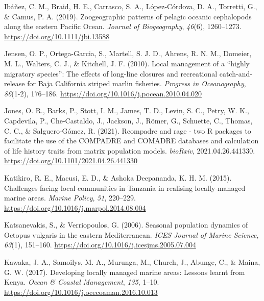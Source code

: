 \documentclass[
]{article}
\newlength{\cslhangindent}
\newlength{\cslentryspacingunit} %
\newenvironment{CSLReferences}[2] %
 {%
  \setlength{\parindent}{0pt}
  \ifodd #1
  \let\oldpar\par
  \def\par{\hangindent=\cslhangindent\oldpar}
  \fi
  \setlength{\parskip}{#2\cslentryspacingunit}
 }%
 {}
\begin{document}
\begin{CSLReferences}{1}{2}
\leavevmode{}%
Ibáñez, C. M., Braid, H. E., Carrasco, S. A., López‐Córdova, D. A., Torretti, G., \& Camus, P. A. (2019). Zoogeographic patterns of pelagic oceanic cephalopods along the eastern {Pacific} {Ocean}. \emph{Journal of Biogeography}, \emph{46}(6), 1260--1273. \url{https://doi.org/10.1111/jbi.13588}

\leavevmode{}%
Jensen, O. P., Ortega-Garcia, S., Martell, S. J. D., Ahrens, R. N. M., Domeier, M. L., Walters, C. J., \& Kitchell, J. F. (2010). Local management of a {``highly migratory species''}: {The} effects of long-line closures and recreational catch-and-release for {Baja} {California} striped marlin fisheries. \emph{Progress in Oceanography}, \emph{86}(1-2), 176--186. \url{https://doi.org/10.1016/j.pocean.2010.04.020}

\leavevmode{}%
Jones, O. R., Barks, P., Stott, I. M., James, T. D., Levin, S. C., Petry, W. K., Capdevila, P., Che-Castaldo, J., Jackson, J., Römer, G., Schuette, C., Thomas, C. C., \& Salguero-Gómez, R. (2021). Rcompadre and rage - two {R} packages to facilitate the use of the {COMPADRE} and {COMADRE} databases and calculation of life history traits from matrix population models. \emph{bioRxiv}, 2021.04.26.441330. \url{https://doi.org/10.1101/2021.04.26.441330}

\leavevmode{}%
Katikiro, R. E., Macusi, E. D., \& Ashoka Deepananda, K. H. M. (2015). Challenges facing local communities in {Tanzania} in realising locally-managed marine areas. \emph{Marine Policy}, \emph{51}, 220--229. \url{https://doi.org/10.1016/j.marpol.2014.08.004}

\leavevmode{}%
Katsanevakis, S., \& Verriopoulos, G. (2006). Seasonal population dynamics of {Octopus} vulgaris in the eastern {Mediterranean}. \emph{ICES Journal of Marine Science}, \emph{63}(1), 151--160. \url{https://doi.org/10.1016/j.icesjms.2005.07.004}

\leavevmode{}%
Kawaka, J. A., Samoilys, M. A., Murunga, M., Church, J., Abunge, C., \& Maina, G. W. (2017). Developing locally managed marine areas: {Lessons} learnt from {Kenya}. \emph{Ocean \& Coastal Management}, \emph{135}, 1--10. \url{https://doi.org/10.1016/j.ocecoaman.2016.10.013}


\end{CSLReferences}
\end{document}
